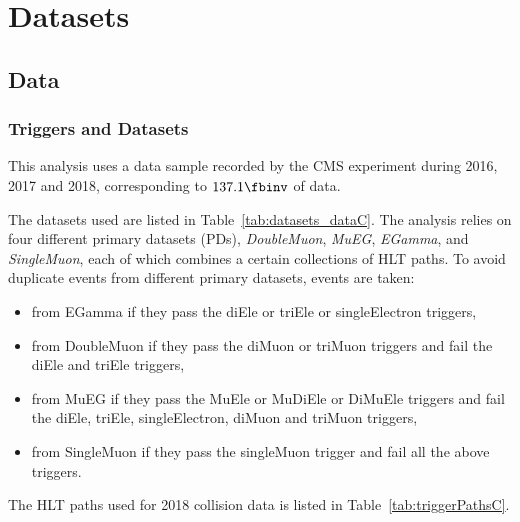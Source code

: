 \section{Datasets}

\subsection{Data}

\subsubsection{Triggers and Datasets}
\label{sec:trigpaths}


This analysis uses a data sample recorded by the CMS experiment during 2016, 2017 and 2018, corresponding to $\usedLumiABC$ of data.  

The datasets used are listed in Table~\ref{tab:datasets_dataC}. 
The analysis relies on four different primary datasets (PDs), {\it DoubleMuon}, {\it MuEG}, {\it EGamma}, and {\it SingleMuon},
each of which combines a certain collections of HLT paths. 
To avoid duplicate events from different primary datasets, events are taken: 
\begin{itemize}
\item from EGamma if they pass the diEle or triEle or singleElectron triggers,
\item from DoubleMuon if they pass the diMuon or triMuon triggers and fail the diEle and triEle triggers,
\item from MuEG if they pass the MuEle or MuDiEle or DiMuEle triggers and fail the diEle, triEle, singleElectron, diMuon and triMuon triggers,
\item from SingleMuon if they pass the singleMuon trigger and fail all the above triggers. 
\end{itemize} 

The HLT paths used for 2018 collision data is listed in Table~\ref{tab:triggerPathsC}.



